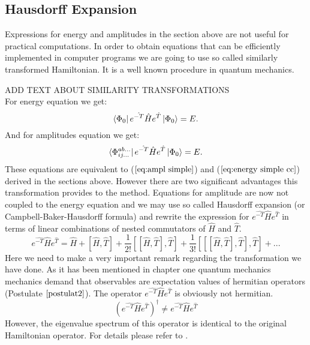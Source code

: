 \documentclass[twoside,english]{uiofysmaster}
\theoremstyle{definition}
\begin{document}
\subsection{Hausdorff Expansion} \label{sec:Hausdorf}
Expressions for energy and amplitudes in the section above are not useful for practical computations. In order to obtain equations that can be efficiently implemented in computer programs we are going to use so called similarly transformed Hamiltonian. It is a well known procedure in quantum mechanics. 

ADD TEXT ABOUT SIMILARITY TRANSFORMATIONS\\
For energy equation we get:
\begin{equation}\label{eq:energy_cc1}
\bra{\Phi_0} e^{\hat{-T}} \hat{H} e^{\hat{T}} \ket{\Phi_0}   = E. 
\end{equation}
And for amplitudes equation we get:
\begin{equation}
\bra{\Phi_{ij...}^{ab...}}e^{\hat{-T}} \hat{H} e^{\hat{T}} \ket{\Phi_0}   = E.
\end{equation} 
These equations are equivalent to ($\ref{eq:ampl simple}$) and ($\ref{eq:energy simple cc}$) derived in the sections above. However there are two significant advantages this transformation provides to the method. Equations for amplitude are now not coupled to the energy equation and we may use so called Hausdorff expansion (or Campbell-Baker-Hausdorff formula) and rewrite the expression for $ e^{\hat{-T}} \hat{H} e^{\hat{T}} $ in terms of linear combinations of nested commutators of $ \hat{H} $ and $\hat{T}$.
\begin{equation}
e^{\hat{-T}} \hat{H} e^{\hat{T}} = \hat{H} + [\hat{H},\hat{T}] + \frac{1}{2!}[[\hat{H},\hat{T}],\hat{T}] + \frac{1}{3!}[[[\hat{H},\hat{T}],\hat{T}],\hat{T}] + ...
\end{equation} 
Here we need to make a very important remark regarding the transformation we have done. As it has been mentioned in chapter one quantum mechanics mechanics demand that observables are expectation values of hermitian operators (Postulate $\ref{postulat2}$). The operator  $e^{\hat{-T}} \hat{H} e^{\hat{T}} $ is obviously not hermitian. 
\begin{equation}
(e^{\hat{-T}} \hat{H} e^{\hat{T}})^\dagger \neq e^{\hat{-T}} \hat{H} e^{\hat{T}}
\end{equation} 
However, the eigenvalue spectrum of this operator is identical to the original Hamiltonian operator. For details please refer to \cite{kutzelniggAlmostVariationalCoupled}.
\end{document}
